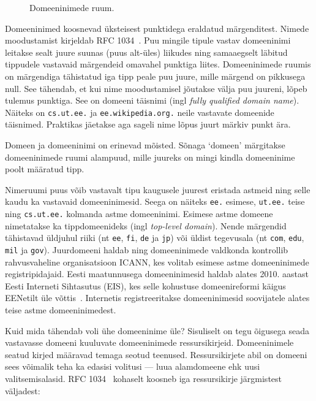\documentclass[../main.tex]{subfiles}
\begin{document}
\begin{figure}[h]
  \caption{Domeeninimede ruum.}
  \label{fig:domain-name-space}
\end{figure}

Domeeninimed koosnevad üksteisest punktidega eraldatud märgenditest.
Nimede moodustamist kirjeldab RFC 1034~\cite{rfc1034}.
Puu mingile tipule vastav domeeninimi leitakse sealt juure suunas (puus alt-üles) liikudes ning samaaegselt läbitud tippudele vastavaid märgendeid omavahel punktiga liites.
Domeeninimede ruumis on märgendiga tähistatud iga tipp peale puu juure, mille märgend on pikkusega null.
See tähendab, et kui nime moodustamisel jõutakse välja puu juureni, lõpeb tulemus punktiga.
See on domeeni täisnimi (ingl \textit{fully qualified domain name}).
Näiteks on \texttt{cs.ut.ee.} ja \texttt{ee.wikipedia.org.} neile vastavate domeenide täisnimed.
Praktikas jäetakse aga sageli nime lõpus juurt märkiv punkt ära.

Domeen ja domeeninimi on erinevad mõisted.
Sõnaga `domeen' märgitakse domeeninimede ruumi alampuud, mille juureks on mingi kindla domeeninime poolt määratud tipp.

Nimeruumi puus võib vastavalt tipu kaugusele juurest eristada astmeid ning selle kaudu ka vastavaid domeeninimesid.
Seega on näiteks \texttt{ee.} esimese, \texttt{ut.ee.} teise ning \texttt{cs.ut.ee.} kolmanda astme domeeninimi.
Esimese astme domeene nimetatakse ka tippdomeenideks (ingl \textit{top-level domain}).
Nende märgendid tähistavad üldjuhul riiki (nt \texttt{ee}, \texttt{fi}, \texttt{de} ja \texttt{jp}) või üldist tegevusala (nt \texttt{com}, \texttt{edu}, \texttt{mil} ja \texttt{gov}).
Juurdomeeni haldab ning domeeninimede valdkonda kontrollib rahvusvaheline organisatsioon ICANN, kes volitab esimese astme domeeninimede registripidajaid.
Eesti maatunnusega domeeninimesid haldab alates 2010. aastast Eesti Interneti Sihtasutus (EIS), kes selle kohustuse domeenireformi käigus EENetilt üle võttis~\cite{eis}.
Internetis registreeritakse domeeninimesid soovijatele alates teise astme domeeninimedest.

Kuid mida tähendab voli ühe domeeninime üle?
Sisuliselt on tegu õigusega seada vastavasse domeeni kuuluvate domeeninimede ressursikirjeid.
Domeeninimele seatud kirjed määravad temaga seotud teenused.
Ressursikirjete abil on domeeni sees võimalik teha ka edasisi volitusi --- luua alamdomeene ehk uusi valitsemisalasid.
RFC 1034~\cite{rfc1034} kohaselt koosneb iga ressursikirje järgmistest väljadest:
\end{document}
